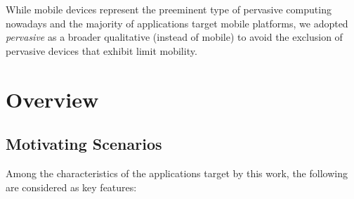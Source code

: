 While mobile devices represent the preeminent type of pervasive computing nowadays and the majority of applications target mobile platforms, we adopted \textit{pervasive} as a broader qualitative (instead of mobile) to avoid the exclusion of pervasive devices that exhibit limit mobility. 

\section{Overview}\label{sec:mobile_applications}



\subsection{Motivating Scenarios}\label{sec:motivating}

Among the characteristics of the applications target by this work, the following are considered as key features:

